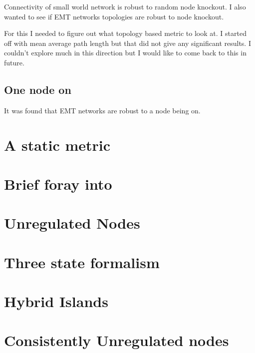 \documentclass{report}
\begin{document}
Connectivity of small world network is robust to random node knockout. 
I also wanted to see if EMT networks topologies are robust to node knockout. 

For this I needed to figure out what topology based metric to look at. I started off with mean average path length but that did not give any significant results. I couldn't explore much in this direction but I would like to come back to this in future. 


\subsection{One node on}
It was found that EMT networks are robust to a node being on. 

\section{A static metric}

\section{Brief foray into }

\section{Unregulated Nodes}

\section{Three state formalism }


\section{Hybrid Islands}


\section{Consistently Unregulated nodes}
\end{document}
